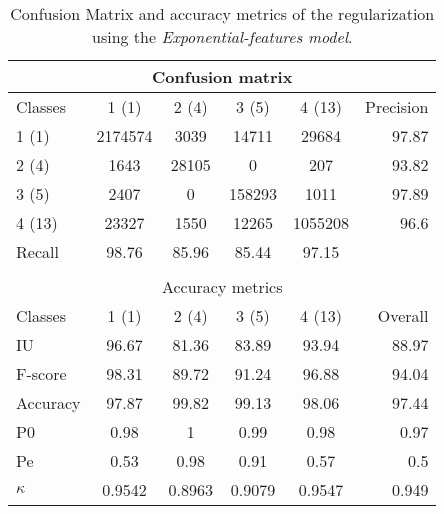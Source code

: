 \begin{table}[H]
\begin{center}
\footnotesize
\begin{tabular}{|l|c|c|c|c|r|}
\hline
\multicolumn{6}{|c|}{Confusion matrix} \\
\hline
 Classes & 1 (1) & 2 (4) & 3 (5) & 4 (13) & Precision \\
\hline
1 (1) & 2174574 & 3039 & 14711 & 29684 & 97.87 \\
\hline
2 (4) & 1643 & 28105 & 0 & 207 & 93.82 \\
\hline
3 (5) & 2407 & 0 & 158293 & 1011 & 97.89 \\
\hline
4 (13) & 23327 & 1550 & 12265 & 1055208 & 96.6 \\
\hline
Recall & 98.76 & 85.96 & 85.44 & 97.15 &  \\
\hline
\multicolumn{6}{c}{ } \\
\hline
\multicolumn{6}{|c|}{Accuracy metrics} \\
\hline
 Classes & 1 (1) & 2 (4) & 3 (5) & 4 (13) & Overall \\
\hline
IU & 96.67 & 81.36 & 83.89 & 93.94 & 88.97 \\
\hline
F-score & 98.31 & 89.72 & 91.24 & 96.88 & 94.04 \\
\hline
Accuracy & 97.87 & 99.82 & 99.13 & 98.06 & 97.44 \\
\hline
P0 & 0.98 & 1 & 0.99 & 0.98 & 0.97 \\
\hline
Pe & 0.53 & 0.98 & 0.91 & 0.57 & 0.5 \\
\hline
$\kappa$ & 0.9542 & 0.8963 & 0.9079 & 0.9547 & 0.949 \\
\hline
\end{tabular}
\caption{Confusion Matrix and accuracy metrics of the regularization  using the \textit{Exponential-features model}.}
\label{table:}
\end{center}
\end{table}
